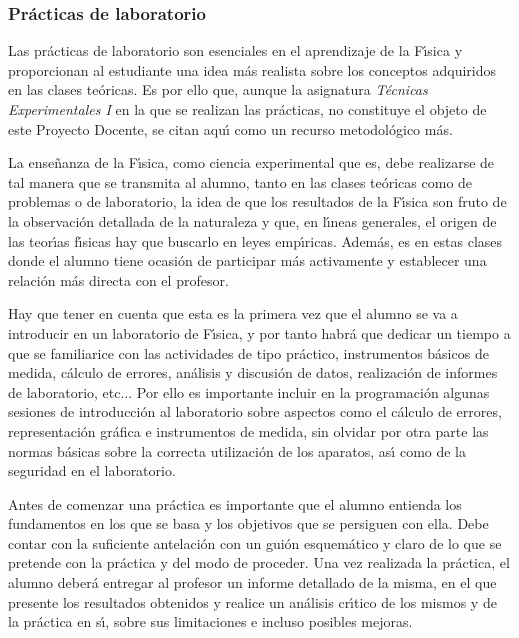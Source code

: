 \subsubsection{Pr\'{a}cticas de laboratorio}

Las pr\'{a}cticas de laboratorio son esenciales
 en el aprendizaje de la F\'{\i}sica y proporcionan al estudiante  una idea
 m\'{a}s realista sobre los conceptos adquiridos en las clases te\'{o}ricas.
Es por ello que,
aunque la
asignatura {\it T\'{e}cnicas Experimentales I} en la que se realizan
las pr\'{a}cticas, no constituye el objeto de este Proyecto Docente, 
se citan aqu\'{\i} como un recurso metodol\'{o}gico m\'{a}s.

 La ense\~{n}anza de la F\'{\i}sica, como ciencia experimental que es, 
debe realizarse de tal manera que se transmita al alumno,
 tanto en las clases te\'{o}ricas como de problemas o de laboratorio,
 la idea de que los resultados de la F\'{\i}sica son fruto de la 
observaci\'{o}n detallada de la naturaleza y que, en l\'{\i}neas generales,
 el origen de las teor\'{\i}as f\'{\i}sicas hay que buscarlo en leyes 
emp\'{\i}ricas. Adem\'{a}s, es en estas clases donde el alumno tiene 
ocasi\'{o}n de participar m\'{a}s activamente y establecer una
 relaci\'{o}n m\'{a}s directa con el profesor.

Hay que tener en cuenta que esta  es la primera
 vez  que el alumno se va a introducir
en un laboratorio de F\'{\i}sica, y por tanto habr\'{a} que dedicar un tiempo 
a que se familiarice con las actividades de tipo pr\'{a}ctico, 
instrumentos b\'{a}sicos de medida, c\'{a}lculo de errores, 
an\'{a}lisis y discusi\'{o}n de datos, realizaci\'{o}n de informes 
de laboratorio, etc... Por  ello es importante incluir en la programaci\'{o}n
algunas 
sesiones de introducci\'{o}n al laboratorio sobre aspectos como el 
c\'{a}lculo de errores, representaci\'{o}n gr\'{a}fica e instrumentos 
de medida, sin olvidar por
otra parte las normas b\'{a}sicas sobre la correcta utilizaci\'{o}n
de los aparatos, as\'{\i} como de la seguridad en el laboratorio. 

Antes de comenzar una pr\'{a}ctica es importante que el alumno 
entienda los fundamentos en los que se basa y los objetivos que
 se persiguen con ella. Debe contar con la suficiente antelaci\'{o}n
 con un gui\'{o}n esquem\'{a}tico y claro de lo que se pretende
 con la pr\'{a}ctica y del modo de proceder. Una vez realizada la pr\'{a}ctica,
 el alumno deber\'{a} entregar al profesor un informe detallado de la misma,
 en el que presente los resultados obtenidos y realice un an\'{a}lisis
 cr\'{\i}tico de los mismos y de la pr\'{a}ctica en s\'{\i},
 sobre sus limitaciones e incluso posibles mejoras.


